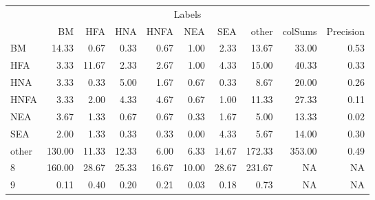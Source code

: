 \begin{table}
\centering\begingroup\fontsize{11}{13}\selectfont

\begin{tabular}{lrrrrrr>{}r|rr}
\toprule
\multicolumn{10}{c}{Labels} \\
\cmidrule(l{3pt}r{3pt}){1-10}
  & BM & HFA & HNA & HNFA & NEA & SEA & other & colSums & Precision\\
\midrule
BM & 14.33 & 0.67 & 0.33 & 0.67 & 1.00 & 2.33 & 13.67 & 33.00 & 0.53\\
HFA & 3.33 & 11.67 & 2.33 & 2.67 & 1.00 & 4.33 & 15.00 & 40.33 & 0.33\\
HNA & 3.33 & 0.33 & 5.00 & 1.67 & 0.67 & 0.33 & 8.67 & 20.00 & 0.26\\
HNFA & 3.33 & 2.00 & 4.33 & 4.67 & 0.67 & 1.00 & 11.33 & 27.33 & 0.11\\
NEA & 3.67 & 1.33 & 0.67 & 0.67 & 0.33 & 1.67 & 5.00 & 13.33 & 0.02\\
\addlinespace
SEA & 2.00 & 1.33 & 0.33 & 0.33 & 0.00 & 4.33 & 5.67 & 14.00 & 0.30\\
other & 130.00 & 11.33 & 12.33 & 6.00 & 6.33 & 14.67 & 172.33 & 353.00 & 0.49\\
8 & 160.00 & 28.67 & 25.33 & 16.67 & 10.00 & 28.67 & 231.67 & NA & NA\\
9 & 0.11 & 0.40 & 0.20 & 0.21 & 0.03 & 0.18 & 0.73 & NA & NA\\
\bottomrule
\end{tabular}
\endgroup{}
\end{table}
